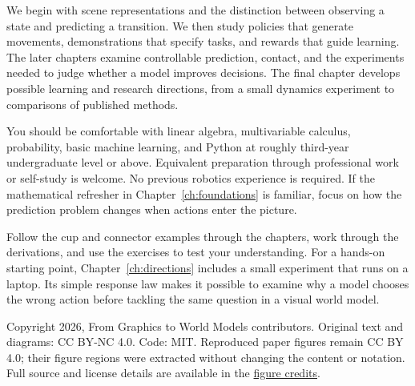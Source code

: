 \documentclass[11pt,a4paper,oneside]{report}
\renewcommand{\chaptermark}[1]{\markboth{Chapter \thechapter}{}}
\newcounter{exercise}[chapter]
\begin{document}
We begin with scene representations and the distinction between observing a state and predicting a transition. We then study policies that generate movements, demonstrations that specify tasks, and rewards that guide learning. The later chapters examine controllable prediction, contact, and the experiments needed to judge whether a model improves decisions. The final chapter develops possible learning and research directions, from a small dynamics experiment to comparisons of published methods.

You should be comfortable with linear algebra, multivariable calculus, probability, basic machine learning, and Python at roughly third-year undergraduate level or above. Equivalent preparation through professional work or self-study is welcome. No previous robotics experience is required. If the mathematical refresher in Chapter~\ref{ch:foundations} is familiar, focus on how the prediction problem changes when actions enter the picture.

Follow the cup and connector examples through the chapters, work through the derivations, and use the exercises to test your understanding. For a hands-on starting point, Chapter~\ref{ch:directions} includes a small experiment that runs on a laptop. Its simple response law makes it possible to examine why a model chooses the wrong action before tackling the same question in a visual world model.

\tableofcontents
\clearpage{}






\appendix
\renewcommand{\chaptermark}[1]{\markboth{Appendix \thechapter}{}}



\clearpage{}

\begingroup\small\setlength{\bibsep}{5pt}\raggedright\endgroup
\par\bigskip
\noindent\begin{minipage}{\linewidth}\footnotesize
Copyright 2026, From Graphics to World Models contributors. Original text and diagrams: CC BY-NC 4.0. Code: MIT. Reproduced paper figures remain CC BY 4.0; their figure regions were extracted without changing the content or notation. Full source and license details are available in the \href{https://github.com/BBBBBbruce/From-Graphics-to-World-Model/blob/main/FIGURES.md}{figure credits}.
\end{minipage}
\end{document}
